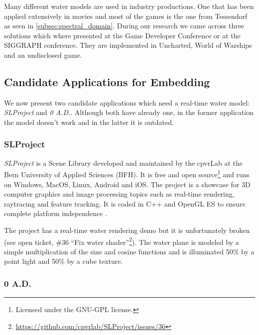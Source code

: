 
Many different water models are used in industry productions. One that has been
applied extensively in movies and most of the games is the one from
Tessendorf \autocite{tessendorf2001simulating} as seen
in \autoref{subsec:spectral_domain}. During our research we came across three
solutions which where presented at the Game Developer Conference or at the
SIGGRAPH conference. They are implemented in Uncharted, World of Warships and an
undisclosed game.



\subsection{Candidate Applications for Embedding}\label{subsec:candidate_apps}

We now present two candidate applications which need a real-time water model:
\textit{SLProject} and \textit{0 A.D.}. Although both have already one,
in the former application the model doesn't work and in the latter it is
outdated.


\subsubsection{SLProject}

\textit{SLProject} is a Scene Library developed and maintained by the cpvrLab at
the Bern University of Applied Sciences (BFH). It is free and open
source\footnote{Licensed under the GNU-GPL license.} and runs on Windows, MacOS,
Linux, Android and iOS\@. The project is a showcase for 3D computer graphics and
image processing topics such as real-time rendering, raytracing and feature
tracking. It is coded in C++ and OpenGL ES to ensure complete platform
independence \autocite{hudritch2017slproject, slproject2017doxygen}.

The project has a real-time water rendering demo but it is unfortunately broken
(see open ticket, \#36 ``Fix water
shader''\footnote{\url{https://github.com/cpvrlab/SLProject/issues/36}}). The
water plane is modeled by a simple multiplication of the sine and cosine
functions and is illuminated 50\% by a point light and 50\% by a cube texture.


\subsubsection{0 A.D.}


